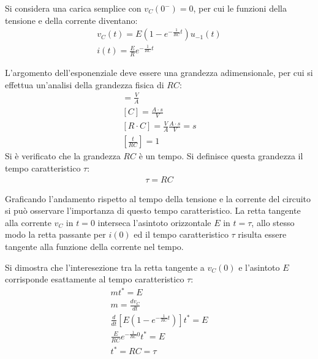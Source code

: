 \documentclass{article}
\numberwithin{equation}{subsection}
\begin{document}
Si considera una carica semplice con $v_C(0^-)=0$, per cui le funzioni della tensione e della corrente diventano:
\begin{gather*}
    v_C(t)=E\left(1-e^{-\frac{1}{RC}t}\right)u_{-1}(t)\\
    i(t)=\displaystyle\frac{E}{R}e^{-\frac{1}{RC}t}
\end{gather*}

L'argomento dell'esponenziale deve essere una grandezza adimensionale, per cui si effettua un'analisi della grandezza fisica di $RC$:
\begin{gather*}
    [R]=\displaystyle\frac{V}{A}\\
    [C]=\displaystyle\frac{A\cdot s}{V}\\
    [R\cdot C]=\displaystyle\frac{V}{A}\frac{A\cdot s}{V}=s\\
    \left[\displaystyle\frac{t}{RC}\right]=1  
\end{gather*}
Si è verificato che la grandezza $RC$ è un tempo. Si definisce questa grandezza il tempo caratteristico $\tau$:
\begin{gather*}
    \tau=RC
\end{gather*}

Graficando l'andamento rispetto al tempo della tensione e la corrente del circuito si può osservare l'importanza di questo tempo caratteristico. La retta tangente alla corrente 
$v_C$ in $t=0$ interseca l'asintoto orizzontale $E$ in $t=\tau$, allo stesso modo la retta passante per $i(0)$ ed il tempo caratteristico $\tau$ risulta essere tangente alla 
funzione della corrente nel tempo. 
\begin{center}
\end{center}
Si dimostra che l'interesezione tra la retta tangente a $v_C(0)$ e l'asintoto $E$ corrisponde esattamente al tempo caratteristico $\tau$:
\begin{gather*}
    mt^*=E\\
    m=\displaystyle\frac{dv_C}{dt}\\
    \displaystyle\frac{d}{dt}\left[E\left(1-e^{-\frac{1}{RC}t}\right)\right]t^*=E\\
    \displaystyle\frac{E}{RC}e^{-\frac{1}{RC}0}t^*=E\\
    t^*=RC=\tau
\end{gather*}
\end{document}
